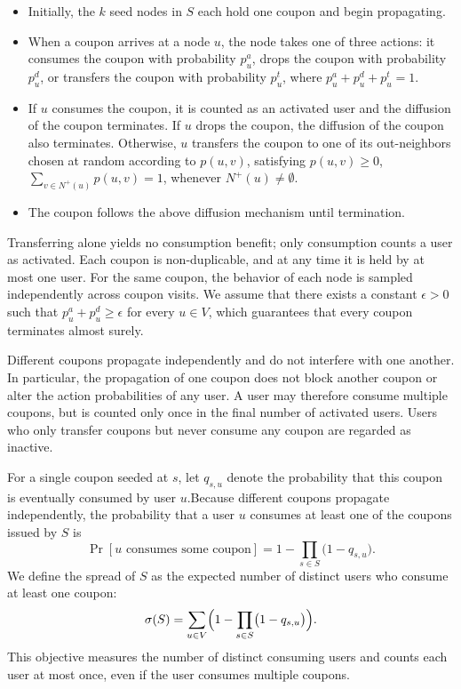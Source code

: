\documentclass[sigconf]{acmart}
\begin{document}
\begin{itemize}
\item
Initially, the $k$ seed nodes in $S$ each hold one coupon and begin propagating.

\item
When a coupon arrives at a node $u$, the node takes one of three actions: it consumes the coupon with probability $p_u^a$, drops the coupon with probability $p_u^d$, or transfers the coupon with probability $p_u^t$, where $p_u^a + p_u^d + p_u^t = 1$.

\item
If $u$ consumes the coupon, it is counted as an activated user and the diffusion of the coupon terminates. If $u$ drops the coupon, the diffusion of the coupon also terminates. Otherwise, $u$ transfers the coupon to one of its out-neighbors chosen at random according to $p(u,v)$, satisfying
$p(u,v)\ge0$,
$\sum_{v\in N^+(u)} p(u,v)=1$, whenever $N^+(u)\neq \emptyset$.

\item
The coupon follows the above diffusion mechanism until termination.

\end{itemize}

Transferring alone yields no consumption benefit; only consumption counts a user as activated. Each coupon is non-duplicable, and at any time it is held by at most one user. For the same coupon, the behavior of each node is sampled independently across coupon visits. We assume that there exists a constant \(\epsilon>0\) such that \(p_u^a+p_u^d\ge \epsilon\) for every \(u\in V\), which guarantees that every coupon terminates almost surely.

Different coupons propagate independently and do not interfere with one another. In particular, the propagation of one coupon does not block another coupon or alter the action probabilities of any user. A user may therefore consume multiple coupons, but is counted only once in the final number of activated users. Users who only transfer coupons but never consume any coupon are regarded as inactive.

For a single coupon seeded at $s$, let $q_{s,u}$ denote the probability that this coupon is eventually consumed by user $u$.Because different coupons propagate independently, the probability that a user $u$ consumes at least one of the coupons issued by $S$ is
\begin{equation}
\Pr[\text{$u$ consumes some coupon}] = 1-\prod_{s\in S}\bigl(1-q_{s,u}\bigr).
\end{equation}
We define the spread of $S$ as the expected number of distinct users who consume at least one coupon:
\begin{equation}
\sigma(S) = \sum_{u \in V} \Bigl(1-\prod_{s\in S}\bigl(1-q_{s,u}\bigr)\Bigr).
\end{equation}
This objective measures the number of distinct consuming users and counts each user at most once, even if the user consumes multiple coupons.
\end{document}
